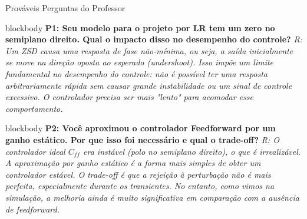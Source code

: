 \documentclass{beamer}
\begin{document}
\begin{frame}[fragile]{Prováveis Perguntas do Professor}
    \begin{beamercolorbox}[rounded=true,shadow=true]{blockbody}
        \textbf{P1: Seu modelo para o projeto por LR tem um zero no semiplano direito. Qual o impacto disso no desempenho do controle?}
        \pause
        \textit{R: Um ZSD causa uma resposta de fase não-mínima, ou seja, a saída inicialmente se move na direção oposta ao esperado (undershoot). Isso impõe um limite fundamental no desempenho do controle: não é possível ter uma resposta arbitrariamente rápida sem causar grande instabilidade ou um sinal de controle excessivo. O controlador precisa ser mais "lento" para acomodar esse comportamento.}
    \end{beamercolorbox}
    \vspace{1em}
    \pause
    \begin{beamercolorbox}[rounded=true,shadow=true]{blockbody}
        \textbf{P2: Você aproximou o controlador Feedforward por um ganho estático. Por que isso foi necessário e qual o trade-off?}
        \pause
        \textit{R: O controlador ideal \(C_{ff}\) era instável (polo no semiplano direito), o que é irrealizável. A aproximação por ganho estático é a forma mais simples de obter um controlador estável. O trade-off é que a rejeição à perturbação não é mais perfeita, especialmente durante os transientes. No entanto, como vimos na simulação, a melhoria ainda é muito significativa em comparação com a ausência de feedforward.}
    \end{beamercolorbox}
\end{frame}
\end{document}
